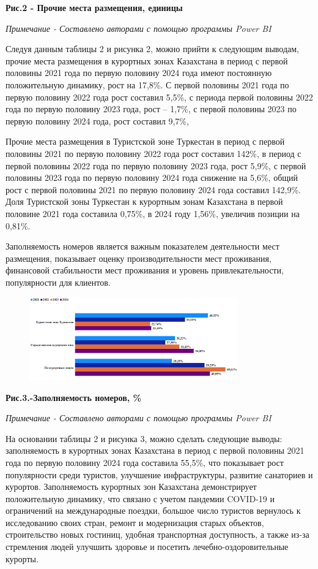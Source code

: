 {\bfseries Рис.2 - Прочие места размещения, единицы}

\emph{Примечание - Составлено авторами с помощью программы Power BI}

Следуя данным таблицы 2 и рисунка 2, можно прийти к следующим выводам,
прочие места размещения в курортных зонах Казахстана в период с первой
половины 2021 года по первую половину 2024 года имеют постоянную
положительную динамику, рост на 17,8\%. С первой половины 2021 года по
первую половину 2022 года рост составил 5,5\%, с периода первой половины
2022 года по первую половину 2023 года, рост -- 1,7\%, с первой половины
2023 по первую половину 2024 года, рост составил 9,7\%,

Прочие места размещения в Туристской зоне Туркестан в период с первой
половины 2021 по первую половину 2022 года рост составил 142\%, в период
с первой половины 2022 года по первую половину 2023 года, рост 5,9\%, с
первой половины 2023 года по первую половину 2024 года снижение на
5,6\%, общий рост с первой половины 2021 по первую половину 2024 года
составил 142,9\%. Доля Туристской зоны Туркестан к курортным зонам
Казахстана в первой половине 2021 года составила 0,75\%, в 2024 году
1,56\%, увеличив позиции на 0,81\%.

Заполняемость номеров является важным показателем деятельности мест
размещения, показывает оценку производительности мест проживания,
финансовой стабильности мест проживания и уровень привлекательности,
популярности для клиентов.

\begin{figure}[H]
	\centering
	\includegraphics[width=0.8\textwidth]{media/ekon2/image5}
	\caption*{}
\end{figure}


{\bfseries Рис.3.-Заполняемость номеров, \%}

\emph{Примечание - Составлено авторами с помощью программы Power BI}

На основании таблицы 2 и рисунка 3, можно сделать следующие выводы:
заполняемость в курортных зонах Казахстана в период с первой половины
2021 года по первую половину 2024 года составила 55,5\%, что показывает
рост популярности среди туристов, улучшение инфраструктуры, развитие
санаториев и курортов. Заполняемость курортных зон Казахстана
демонстрирует положительную динамику, что связано с учетом пандемии
COVID-19 и ограничений на международные поездки, большое число туристов
вернулось к исследованию своих стран, ремонт и модернизация старых
объектов, строительство новых гостиниц, удобная транспортная
доступность, а также из-за стремления людей улучшить здоровье и посетить
лечебно-оздоровительные курорты.

